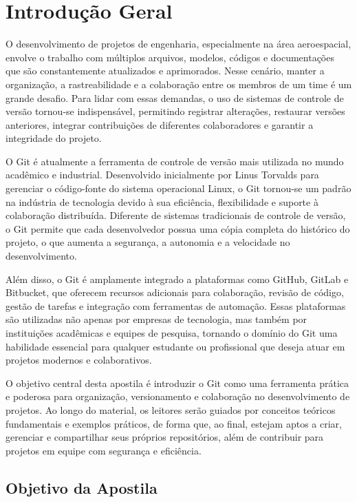 \section{Introdução Geral}

O desenvolvimento de projetos de engenharia, especialmente na área aeroespacial, envolve o trabalho com múltiplos arquivos, modelos, códigos e documentações que são constantemente atualizados e aprimorados. Nesse cenário, manter a organização, a rastreabilidade e a colaboração entre os membros de um time é um grande desafio. Para lidar com essas demandas, o uso de sistemas de controle de versão tornou-se indispensável, permitindo registrar alterações, restaurar versões anteriores, integrar contribuições de diferentes colaboradores e garantir a integridade do projeto.

O Git é atualmente a ferramenta de controle de versão mais utilizada no mundo acadêmico e industrial. Desenvolvido inicialmente por Linus Torvalds para gerenciar o código-fonte do sistema operacional Linux, o Git tornou-se um padrão na indústria de tecnologia devido à sua eficiência, flexibilidade e suporte à colaboração distribuída. Diferente de sistemas tradicionais de controle de versão, o Git permite que cada desenvolvedor possua uma cópia completa do histórico do projeto, o que aumenta a segurança, a autonomia e a velocidade no desenvolvimento.

Além disso, o Git é amplamente integrado a plataformas como GitHub, GitLab e Bitbucket, que oferecem recursos adicionais para colaboração, revisão de código, gestão de tarefas e integração com ferramentas de automação. Essas plataformas são utilizadas não apenas por empresas de tecnologia, mas também por instituições acadêmicas e equipes de pesquisa, tornando o domínio do Git uma habilidade essencial para qualquer estudante ou profissional que deseja atuar em projetos modernos e colaborativos.

O objetivo central desta apostila é introduzir o Git como uma ferramenta prática e poderosa para organização, versionamento e colaboração no desenvolvimento de projetos. Ao longo do material, os leitores serão guiados por conceitos teóricos fundamentais e exemplos práticos, de forma que, ao final, estejam aptos a criar, gerenciar e compartilhar seus próprios repositórios, além de contribuir para projetos em equipe com segurança e eficiência.

\subsection{Objetivo da Apostila}


